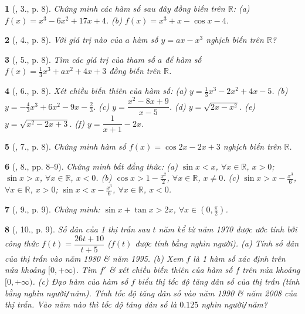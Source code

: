 \documentclass{article}
\newtheorem{baitoan}{}
\begin{document}
\begin{baitoan}[\cite{SGK_Toan_12_giai_tich_nang_cao}, 3., p. 8]
	Chứng minh các hàm số sau đây đồng biến trên $\mathbb{R}$: (a) $f(x) = x^3 - 6x^2 + 17x + 4$. (b) $f(x) = x^3 + x - \cos x - 4$.
\end{baitoan}

\begin{baitoan}[\cite{SGK_Toan_12_giai_tich_nang_cao}, 4., p. 8]
	Với giá trị nào của $a$ hàm số $y = ax - x^3$ nghịch biến trên $\mathbb{R}$?
\end{baitoan}

\begin{baitoan}[\cite{SGK_Toan_12_giai_tich_nang_cao}, 5., p. 8]
	Tìm các giá trị của tham số $a$ để hàm số $f(x) = \frac{1}{3}x^3 + ax^2 + 4x + 3$ đồng biến trên $\mathbb{R}$.
\end{baitoan}

\begin{baitoan}[\cite{SGK_Toan_12_giai_tich_nang_cao}, 6., p. 8]
	Xét chiều biến thiên của hàm số: (a) $y = \frac{1}{3}x^3 - 2x^2 + 4x - 5$. (b) $y = -\frac{4}{3}x^3 + 6x^2 - 9x - \frac{2}{3}$. (c) $y = \dfrac{x^2 - 8x + 9}{x - 5}$. (d) $y = \sqrt{2x - x^2}$. (e) $y = \sqrt{x^2 - 2x + 3}$. (f) $y = \dfrac{1}{x + 1} - 2x$.
\end{baitoan}

\begin{baitoan}[\cite{SGK_Toan_12_giai_tich_nang_cao}, 7., p. 8]
	Chứng minh hàm số $f(x) = \cos2x - 2x + 3$ nghịch biến trên $\mathbb{R}$.
\end{baitoan}

\begin{baitoan}[\cite{SGK_Toan_12_giai_tich_nang_cao}, 8., pp. 8--9]
	Chứng minh bất đẳng thức: (a) $\sin x < x$, $\forall x\in\mathbb{R}$, $x > 0$; $\sin x > x$, $\forall x\in\mathbb{R}$, $x < 0$. (b) $\cos x > 1 - \frac{x^2}{2}$, $\forall x\in\mathbb{R}$, $x\ne0$. (c) $\sin x > x - \frac{x^3}{6}$, $\forall x\in\mathbb{R}$, $x > 0$; $\sin x < x - \frac{x^3}{6}$, $\forall x\in\mathbb{R}$, $x < 0$.
\end{baitoan}

\begin{baitoan}[\cite{SGK_Toan_12_giai_tich_nang_cao}, 9., p. 9]
	Chứng minh: $\sin x + \tan x > 2x$, $\forall x\in\left(0,\frac{\pi}{2}\right)$.
\end{baitoan}

\begin{baitoan}[\cite{SGK_Toan_12_giai_tich_nang_cao}, 10., p. 9]
	Số dân của 1 thị trấn sau $t$ năm kể từ năm 1970 được ước tính bởi công thức $f(t) = \dfrac{26t + 10}{t + 5}$ ($f(t)$ được tính bằng nghìn người). (a) Tính số dân của thị trấn vào năm 1980 \& năm 1995. (b) Xem $f$ là 1 hàm số xác định trên nửa khoảng $[0,+\infty)$. Tìm $f'$ \& xét chiều biến thiên của hàm số $f$ trên nửa khoảng $[0,+\infty)$. (c) Đạo hàm của hàm số $f$ biểu thị tốc độ tăng dân số của thị trấn (tính bằng nghìn người{\tt/}năm). Tính tốc độ tăng dân số vào năm 1990 \& năm 2008 của thị trấn. Vào năm nào thì tốc độ tăng dân số là $0.125$ nghìn người{\tt/}năm?
\end{baitoan}
\end{document}
